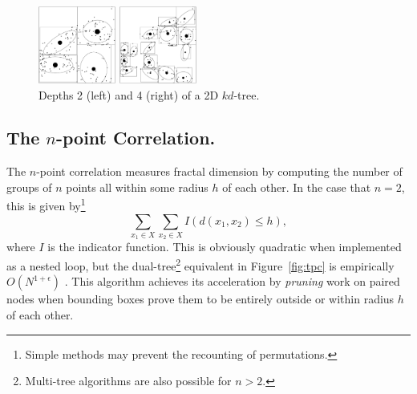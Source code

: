 \documentclass[twoside,leqno,twocolumn]{article}
\begin{document}
\begin{figure}[tb]
  \begin{center}
    \begin{minipage}{1.05in}
      \includegraphics[width=1.0in]{kdtree-level2.ps}
    \end{minipage}
    \begin{minipage}{1.05in}
      \includegraphics[width=1.0in]{kdtree-level4.ps}
    \end{minipage}
    \begin{minipage}{1.05in}
      \caption{\label{fig:kd-trees}\footnotesize Depths 2 (left) and 4
	(right) of a 2D $kd$-tree.}
    \end{minipage}
  \end{center}
  \vspace{-10pt}
\end{figure}

\subsection{The $n$-point Correlation.}
The $n$-point correlation measures fractal dimension by computing the
number of groups of $n$ points all within some radius $h$ of each
other.  In the case that $n = 2$, this is given by\footnote{Simple
methods may prevent the recounting of permutations.}
\begin{equation}
  \sum_{x_1 \in X} \sum_{x_2 \in X} I(d(x_1,x_2) \leq h) ,
\end{equation}
where $I$ is the indicator function.  This is obviously quadratic when
implemented as a nested loop, but the dual-tree\footnote{Multi-tree
algorithms are also possible for $n > 2$.} equivalent in
Figure~\ref{fig:tpc} is empirically $O(N^{1+\epsilon})$
\cite{nips2000paper}.  This algorithm achieves its acceleration by
{\em pruning} work on paired nodes when bounding boxes prove them to
be entirely outside or within radius $h$ of each other.
\end{document}
